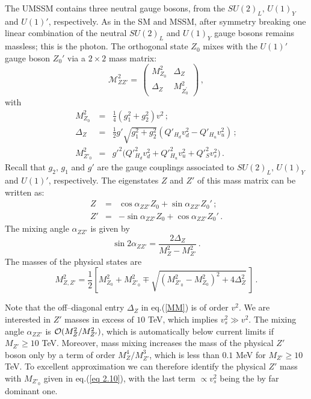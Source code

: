 \documentclass[a4paper,11pt]{article}
\begin{document}
The UMSSM contains three neutral gauge bosons, from the $SU(2)_L, \, U(1)_Y$
and $U(1)'$, respectively. As in the SM and MSSM, after symmetry breaking
one linear combination of the neutral $SU(2)_L$ and $U(1)_Y$ gauge
bosons remains massless; this is the photon. The orthogonal state $Z_0$ mixes
with the $U(1)'$ gauge boson $Z_0'$ via a $2 \times 2$ mass matrix:
%
\begin{equation} \label{MM}
\mathcal{M}^2_{ZZ'}= \, \left( 
\begin{array}{cc} 
M_{Z_0}^2 & \Delta_Z \\  \Delta_Z  & M_{Z_0^{\prime}}^2 \end{array} 
\right)\,,
\end{equation}
with
%
\begin{eqnarray}
M_{Z_0}^2 & = & \frac{1}{4} (g_1^2+g_2^2) v^2\,;       \label{37}
\\
\Delta_Z & = & \frac{1}{2} g' \sqrt{g_1^2+g_2^2} \left( 
Q'_{H_d} v_d^2 - Q'_{H_u} v_u^2\right)\,;  \label{42}
\\
M_{Z'_0}^2 & = & g'^2 \Big( Q'^2_{H_d} v_d^2  + Q'^2_{H_u} v_u^{2}  
+ Q'^2_S v_s^2 \Big)\,.           \label{eq 2.10}
\end{eqnarray}
%
Recall that $g_2, \, g_1$ and $g'$ are the gauge couplings associated
to $SU(2)_L, \, U(1)_Y$ and $U(1)'$, respectively. The eigenstates
$Z$ and $Z'$ of this mass matrix can be written as:
%
\begin{eqnarray}
Z & = & \cos{\alpha_{ZZ'}} Z_0 + \sin{\alpha_{ZZ'}} Z_0'\,; \nonumber \label{44}
\\
Z' & = & -\sin{\alpha_{ZZ'}} Z_0 + \cos{\alpha_{ZZ'}}Z_0'\,.     \label{45}
\end{eqnarray}
%
The mixing angle $\alpha_{ZZ'}$ is given by
%
\begin{equation}
\sin{2\alpha_{ZZ'}} = \frac{2\Delta_{Z}} { M_Z^2 - M_{Z'}^2 }\,.
\end{equation}
%
The masses of the physical states are
%
\begin{equation}
M_{Z,Z'}^2 = \frac{1}{2} \left[ M_{Z_0}^2 + M_{Z'_0}^2 \mp 
\sqrt{\left( M_{Z'_0}^2 - M_{Z_0}^2 \right)^2 + 4\Delta_Z^2} \ \right]\,.
\end{equation}

Note that the off--diagonal entry $\Delta_Z$ in eq.(\ref{MM}) is of
order $v^2$. We are interested in $Z'$ masses in excess of $10$ TeV,
which implies $v_s^2 \gg v^2$. The mixing angle $\alpha_{ZZ'}$ is
${\cal O}(M_Z^2 / M^2_{Z'})$, which is automatically below current
limits \cite{pdg} if $M_{Z'} \geq 10$ TeV. Moreover, mass mixing
increases the mass of the physical $Z'$ boson only by a term of order
$M^4_Z/M^3_{Z'}$, which is less than $0.1$ MeV for $M_{Z'} \geq 10$
TeV. To excellent approximation we can therefore identify the physical
$Z'$ mass with $M_{Z'_0}$ given in eq.(\ref{eq 2.10}), with the last
term $\propto v_s^2$ being the by far dominant one.
\end{document}
